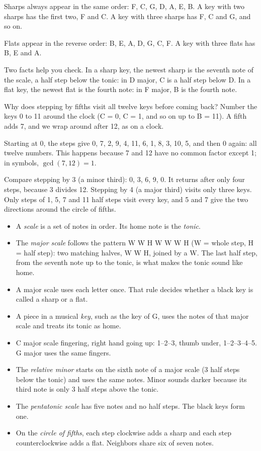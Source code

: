 Sharps always appear in the same order: F\sh, C\sh, G\sh, D\sh, A\sh, E\sh, B\sh. A key with two sharps has the first two, F\sh{} and C\sh. A key with three sharps has F\sh, C\sh{} and G\sh, and so on.

Flats appear in the reverse order: B\fl, E\fl, A\fl, D\fl, G\fl, C\fl, F\fl. A key with three flats has B\fl, E\fl{} and A\fl.

Two facts help you check. In a sharp key, the newest sharp is the seventh note of the scale, a half step below the tonic: in D major, C\sh{} is a half step below D. In a flat key, the newest flat is the fourth note: in F major, B\fl{} is the fourth note.

\begin{curiousbox}
Why does stepping by fifths visit all twelve keys before coming back? Number the keys 0 to 11 around the clock (C = 0, C\sh{} = 1, and so on up to B = 11). A fifth adds 7, and we wrap around after 12, as on a clock.

Starting at 0, the steps give 0, 7, 2, 9, 4, 11, 6, 1, 8, 3, 10, 5, and then 0 again: all twelve numbers. This happens because 7 and 12 have no common factor except 1; in symbols, $\gcd(7, 12) = 1$.

Compare stepping by 3 (a minor third): 0, 3, 6, 9, 0. It returns after only four steps, because 3 divides 12. Stepping by 4 (a major third) visits only three keys. Only steps of 1, 5, 7 and 11 half steps visit every key, and 5 and 7 give the two directions around the circle of fifths.
\end{curiousbox}

\begin{summarybox}
\begin{itemize}
  \item A \emph{scale} is a set of notes in order. Its home note is the \emph{tonic}.
  \item The \emph{major scale} follows the pattern W W H W W W H (W = whole step, H = half step): two matching halves, W W H, joined by a W. The last half step, from the seventh note up to the tonic, is what makes the tonic sound like home.
  \item A major scale uses each letter once. That rule decides whether a black key is called a sharp or a flat.
  \item A piece in a musical \emph{key}, such as the key of G, uses the notes of that major scale and treats its tonic as home.
  \item C major scale fingering, right hand going up: 1--2--3, thumb under, 1--2--3--4--5. G major uses the same fingers.
  \item The \emph{relative minor} starts on the sixth note of a major scale (3 half steps below the tonic) and uses the same notes. Minor sounds darker because its third note is only 3 half steps above the tonic.
  \item The \emph{pentatonic scale} has five notes and no half steps. The black keys form one.
  \item On the \emph{circle of fifths}, each step clockwise adds a sharp and each step counterclockwise adds a flat. Neighbors share six of seven notes.
\end{itemize}
\end{summarybox}

